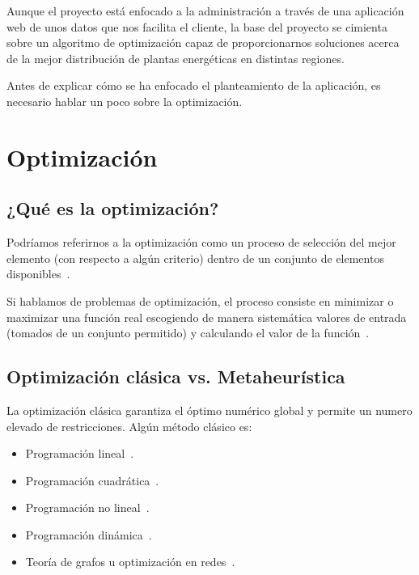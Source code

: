 
Aunque el proyecto está enfocado a la administración a través de una aplicación web de unos datos que nos facilita el cliente, la base del proyecto se cimienta sobre un algoritmo de optimización capaz de proporcionarnos soluciones acerca de la mejor distribución de plantas energéticas en distintas regiones. 

Antes de explicar cómo se ha enfocado el planteamiento de la aplicación, es necesario hablar un poco sobre la optimización.

\section{Optimización}

\subsection{¿Qué es la optimización?}

Podríamos referirnos a la optimización como un proceso de selección del mejor elemento (con respecto a algún criterio) dentro de un conjunto de elementos disponibles~\cite{wiki:optimizacion}.

Si hablamos de problemas de optimización, el proceso consiste en minimizar o maximizar una función real escogiendo de manera sistemática valores de entrada (tomados de un conjunto permitido) y calculando el valor de la función~\cite{wiki:optimizacion}.

\subsection{Optimización clásica vs. Metaheurística}

La optimización clásica garantiza el óptimo numérico global y permite un numero elevado de restricciones. Algún método clásico es:
\begin{itemize}
	\item Programación lineal~\cite{web:programacionLineal}.
	\item Programación cuadrática~\cite{web:programacionCuadratica}.
	\item Programación no lineal~\cite{web:programacionNoLineal}.
	\item Programación dinámica~\cite{web:programacionDinamica}.
	\item Teoría de grafos u optimización en redes~\cite{pdf:teoriaGrafos}.
\end{itemize}

